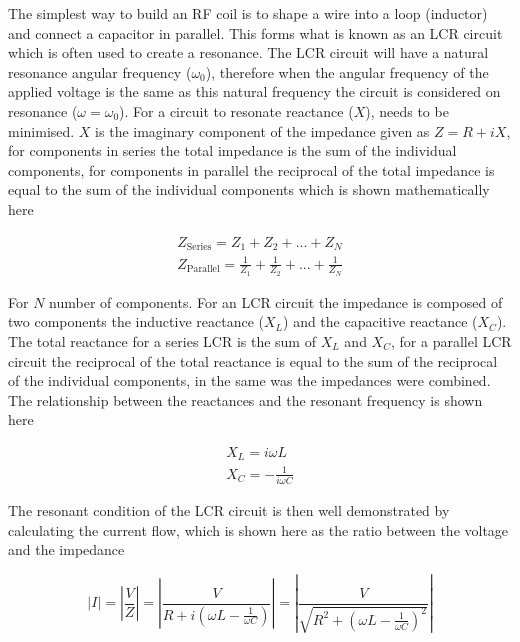 The simplest way to build an \ac{RF} coil is to shape a wire into a loop (inductor) and connect a capacitor in parallel. This forms what is known as an LCR circuit which is often used to create a resonance. The LCR circuit will have a natural resonance angular frequency ($\omega_0$), therefore when the angular frequency of the applied voltage is the same as this natural frequency the circuit is considered on resonance ($\omega=\omega_0$). For a circuit to resonate reactance ($X$), needs to be minimised. $X$ is the imaginary component of the impedance given as $Z = R+iX$, for components in series the total impedance is the sum of the individual components, for components in parallel the reciprocal of the total impedance is equal to the sum of the individual components which is shown mathematically here 

\begin{equation}
    \begin{gathered}
        Z_\text{Series} = Z_1 + Z_2 + ... + Z_N \\
        Z_\text{Parallel} = \frac{1}{Z_1} + \frac{1}{Z_2} + ... + \frac{1}{Z_N}
    \end{gathered}
\end{equation}

For $N$ number of components. For an LCR circuit the impedance is composed of two components the inductive reactance ($X_L$) and the capacitive reactance ($X_C$). The total reactance for a series LCR is the sum of $X_L$ and $X_C$, for a parallel LCR circuit the reciprocal of the total reactance is equal to the sum of the reciprocal of the individual components, in the same was the impedances were combined. The relationship between the reactances and the resonant frequency is shown here

\begin{equation}
\begin{gathered}
    X_L = i\omega L \\
    X_C = -\frac{1}{i\omega C}
    \label{eqn:coils:X}
\end{gathered}
\end{equation}

The resonant condition of the LCR circuit is then well demonstrated by calculating the current flow, which is shown here as the ratio between the voltage and the impedance

\begin{equation}
    |I| = \left| \frac{V}{Z} \right| = \left| \frac{V}{R+i(\omega L - \frac{1}{\omega C})} \right| = \left| \frac{V}{\sqrt{R^2+(\omega L - \frac{1}{\omega C})^2}} \right|
    \label{eqn:coils:I}
\end{equation}

